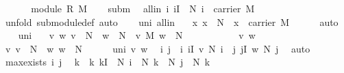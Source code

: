 \begin{isabellebody}
\isamarkupfalse%
\ {\isacharminus}\isanewline
\ \ \isamarkupfalse%
\ {}{\isacharcolon}\ {\isachardoublequoteopen}module\ R\ M{\isachardoublequoteclose}\isacommand{{\isachardot}{\isachardot}}\isamarkupfalse%
\isanewline
\ \ \isamarkupfalse%
\ subm\ \isamarkupfalse%
\ all{\isacharunderscore}in{\isacharcolon}\ {\isachardoublequoteopen}{\isasymAnd}i{\isachardot}\ i{\isasymin}I\ {\isasymLongrightarrow}\ N\ i\ {\isasymsubseteq}\ carrier\ M{\isachardoublequoteclose}\isanewline
\ \ \ \ \isamarkupfalse%
\ {\isacharparenleft}unfold\ submodule{\isacharunderscore}def{\isacharcomma}\ auto{\isacharparenright}\isanewline
\ \ \isamarkupfalse%
\ uni\ all{\isacharunderscore}in\ \isamarkupfalse%
\ {}{\isacharcolon}\ {\isachardoublequoteopen}{\isasymAnd}x{\isachardot}\ x\ {\isasymin}\ N{\isacharprime}\ {\isasymLongrightarrow}\ x\ {\isasymin}\ carrier\ M{\isachardoublequoteclose}\isanewline
\ \ \ \ \isamarkupfalse%
\ auto\isanewline
\ \ \isamarkupfalse%
\ uni\ \isamarkupfalse%
\ {}{\isacharcolon}\ {\isachardoublequoteopen}{\isasymAnd}v\ w{\isachardot}\ v\ {\isasymin}\ N{\isacharprime}\ {\isasymLongrightarrow}\ w\ {\isasymin}\ N{\isacharprime}\ {\isasymLongrightarrow}\ v\ {\isasymoplus}\isactrlbsub M\isactrlesub \ w\ {\isasymin}\ N{\isacharprime}{\isachardoublequoteclose}\isanewline
\ \ \isamarkupfalse%
\ {\isacharminus}\ \isanewline
\ \ \ \ \isamarkupfalse%
\ v\ w\isanewline
\ \ \ \ \isamarkupfalse%
\ v{\isacharcolon}\ {\isachardoublequoteopen}v\ {\isasymin}\ N{\isacharprime}{\isachardoublequoteclose}\ \ w{\isacharcolon}\ {\isachardoublequoteopen}w\ {\isasymin}\ N{\isacharprime}{\isachardoublequoteclose}\isanewline
\ \ \ \ \isamarkupfalse%
\ uni\ v\ w\ \isamarkupfalse%
\ i\ j\ \ i{\isacharcolon}\ {\isachardoublequoteopen}i{\isasymin}I{\isasymand}\ v{\isasymin}\ N\ i{\isachardoublequoteclose}\ \ j{\isacharcolon}\ {\isachardoublequoteopen}j{\isasymin}I{\isasymand}\ w{\isasymin}\ N\ j{\isachardoublequoteclose}\ \isamarkupfalse%
\ auto\isanewline
\ \ \ \ \isamarkupfalse%
\ max{\isacharunderscore}exists\ i\ j\ \isamarkupfalse%
\ k\ \ k{\isacharcolon}\ {\isachardoublequoteopen}k{\isasymin}I\ {\isasymand}\ N\ i\ {\isasymsubseteq}\ N\ k\ {\isasymand}\ N\ j\ {\isasymsubseteq}\ N\ k{\isachardoublequoteclose}\ \isamarkupfalse%

\end{isabellebody}
